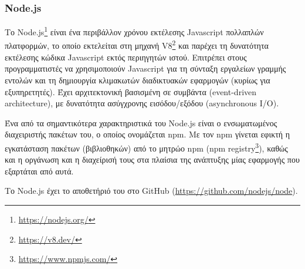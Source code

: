 \subsubsection{Node.js} \label{subsection:4-3-1-1-node.js}


Το Node.js\footnote{\url{https://nodejs.org/}} είναι ένα περιβάλλον χρόνου εκτέλεσης Javascript πολλαπλών πλατφορμών, το οποίο εκτελείται στη μηχανή V8\footnote{\url{https://v8.dev/}} και παρέχει τη δυνατότητα εκτέλεσης κώδικα Javascript εκτός περιηγητών ιστού. Επιτρέπει στους προγραμματιστές να χρησιμοποιούν Javascript για τη σύνταξη εργαλείων γραμμής εντολών και τη δημιουργία κλιμακωτών διαδικτυακών εφαρμογών (κυρίως για εξυπηρετητές). Έχει αρχιτεκτονική βασισμένη σε συμβάντα (event-driven architecture), με δυνατότητα ασύγχρονης εισόδου/εξόδου (asynchronous I/O).\cite{4.3-node.js}

Ένα από τα σημαντικότερα χαρακτηριστικά του Node.js είναι ο ενσωματωμένος διαχειριστής πακέτων του, ο οποίος ονομάζεται npm. Με τον npm γίνεται εφικτή η εγκατάσταση πακέτων (βιβλιοθηκών) από το μητρώο npm (npm registry\footnote{\url{https://www.npmjs.com/}}), καθώς και η οργάνωση και η διαχείρισή τους στα πλαίσια της ανάπτυξης μίας εφαρμογής που εξαρτάται από αυτά.

Το Node.js έχει το αποθετήριό του στο GitHub (\url{https://github.com/nodejs/node}).

